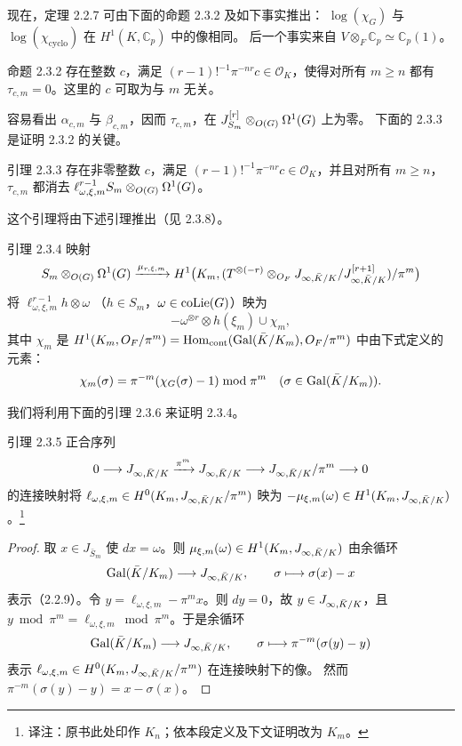 现在，定理 2.2.7 可由下面的命题 2.3.2 及如下事实推出：
$\log(\chi_G)$ 与 $\log(\chi_{\mathrm{cyclo}})$ 在 $H^1(K,\mathbb C_p)$ 中的像相同。
后一个事实来自 $V\otimes_F\mathbb C_p\simeq\mathbb C_p(1)$。
\begin{statement}{命题 2.3.2}
存在整数 $c$，满足 $(r-1)!^{-1}\pi^{-nr}c\in\mathcal O_K$，使得对所有 $m\geq n$
都有 $\tau_{c,m}=0$。这里的 $c$ 可取为与 $m$ 无关。
\end{statement}
容易看出 $\alpha_{c,m}$ 与 $\beta_{c,m}$，因而 $\tau_{c,m}$，在
$J_{S_m}^{[r]}\otimes_{O(G)}\Omega^1(G)$ 上为零。
下面的 2.3.3 是证明 2.3.2 的关键。
\begin{statement}{引理 2.3.3}
存在非零整数 $c$，满足 $(r-1)!^{-1}\pi^{-nr}c\in\mathcal O_K$，并且对所有 $m\geq n$，
$\tau_{c,m}$ 都消去 $\ell_{\omega,\xi,m}^{r-1}S_m\otimes_{O(G)}\Omega^1(G)$。
\end{statement}
这个引理将由下述引理推出（见 2.3.8）。
\begin{statement}{引理 2.3.4}
映射
\[
S_m\otimes_{O(G)}\Omega^1(G)\xrightarrow{\mu_{r,\xi,m}}
H^1\bigl(K_m,(T^{\otimes(-r)}\otimes_{O_F}
J_{\infty,\bar K/K}/J_{\infty,\bar K/K}^{[r+1]})/\pi^m\bigr)
\]
将 $\ell_{\omega,\xi,m}^{r-1}h\otimes\omega$
（$h\in S_m$，$\omega\in\operatorname{coLie}(G)$）映为
\[
-\omega^{\otimes r}\otimes h(\xi_m)\cup\chi_m,
\]
其中 $\chi_m$ 是
$H^1(K_m,O_F/\pi^m)=\operatorname{Hom}_{\mathrm{cont}}(\operatorname{Gal}(\bar K/K_m),O_F/\pi^m)$
中由下式定义的元素：
\[
\chi_m(\sigma)=\pi^{-m}(\chi_G(\sigma)-1)\bmod\pi^m
\quad(\sigma\in\operatorname{Gal}(\bar K/K_m)).
\]
\end{statement}
我们将利用下面的引理 2.3.6 来证明 2.3.4。
\begin{statement}{引理 2.3.5}
正合序列
\[
0\longrightarrow J_{\infty,\bar K/K}\xrightarrow{\pi^m}J_{\infty,\bar K/K}
\longrightarrow J_{\infty,\bar K/K}/\pi^m\longrightarrow0
\]
的连接映射将 $\ell_{\omega,\xi,m}\in H^0(K_m,J_{\infty,\bar K/K}/\pi^m)$ 映为
$-\mu_{\xi,m}(\omega)\in H^1(K_m,J_{\infty,\bar K/K})$。\footnote{译注：原书此处印作 $K_n$；依本段定义及下文证明改为 $K_m$。}
\end{statement}
\begin{proof}
取 $x\in J_{\bar S_m}$ 使 $dx=\omega$。则 $\mu_{\xi,m}(\omega)\in H^1(K_m,J_{\infty,\bar K/K})$
由余循环
\[
\operatorname{Gal}(\bar K/K_m)\longrightarrow J_{\infty,\bar K/K},
\qquad\sigma\longmapsto\sigma(x)-x
\]
表示（2.2.9）。令 $y=\ell_{\omega,\xi,m}-\pi^m x$。则 $dy=0$，故 $y\in J_{\infty,\bar K/K}$，且
$y\bmod\pi^m=\ell_{\omega,\xi,m}\bmod\pi^m$。于是余循环
\[
\operatorname{Gal}(\bar K/K_m)\longrightarrow J_{\infty,\bar K/K},
\qquad\sigma\longmapsto\pi^{-m}(\sigma(y)-y)
\]
表示 $\ell_{\omega,\xi,m}\in H^0(K_m,J_{\infty,\bar K/K}/\pi^m)$ 在连接映射下的像。
然而 $\pi^{-m}(\sigma(y)-y)=x-\sigma(x)$。
\end{proof}
